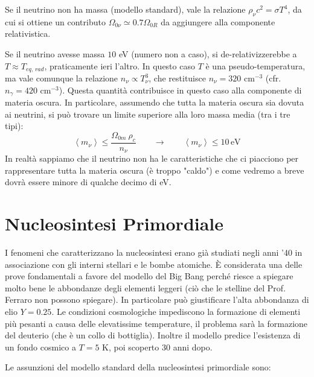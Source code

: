 Se il neutrino non ha massa (modello standard), vale la relazione $\rho_\nu c^2 =\sigma T^4$, da cui si ottiene un contributo $\Omega_{0\nu}\simeq 0.7 \Omega_{0R}$ da aggiungere alla componente relativistica. 

Se il neutrino avesse massa $10$ eV (numero non a caso), si de-relativizzerebbe a $T\approx T_{eq,\, rad}$, praticamente ieri l'altro. In questo caso $T$ è una pseudo-temperatura, ma vale comunque la relazione $n_\nu \propto T_\nu^3$, che restituisce $n_\nu = 320$ cm$^{-3}$ (cfr. $n_\gamma=420$ cm$^{-3}$). Questa quantità contribuisce in questo caso alla componente di materia oscura. In particolare, assumendo che tutta la materia oscura sia dovuta ai neutrini, si può trovare un limite superiore alla loro massa media (tra i tre tipi):
$$
\left \langle m_\nu \right \rangle \le \frac{\Omega_{0m} ~\rho_{c}}{n_\nu} \qquad \rightarrow\qquad \left \langle m_\nu \right \rangle \le 10\, \mathrm{eV}
$$
In realtà sappiamo che il neutrino non ha le caratteristiche che ci piacciono per rappresentare tutta la materia oscura (è troppo "caldo") e come vedremo a breve dovrà essere minore di qualche decimo di eV. 


\section{Nucleosintesi Primordiale}
I fenomeni che caratterizzano la nucleosintesi erano già studiati negli anni '40 in associazione con gli interni stellari e le bombe atomiche. È considerata una delle prove fondamentali a favore del modello del Big Bang perché riesce a spiegare molto bene le abbondanze degli elementi leggeri (ciò che le stelline del Prof. Ferraro non possono spiegare). In particolare può giustificare l'alta abbondanza di elio $Y=0.25$. Le condizioni cosmologiche impediscono la formazione di elementi più pesanti a causa delle elevatissime temperature, il problema sarà la formazione del deuterio (che è un collo di bottiglia). Inoltre il modello predice l'esistenza di un fondo cosmico a $T=5$ K, poi scoperto 30 anni dopo. 

\vspace{1em}
\noindent Le assunzioni del modello standard della nucleosintesi primordiale sono:


